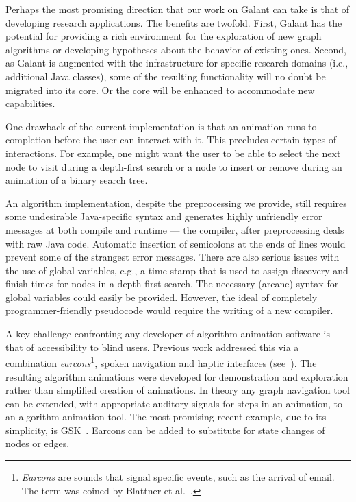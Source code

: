 Perhaps the most promising direction that our work on Galant can take is
that of developing research applications.
The benefits are twofold.
First, Galant has the potential for providing a rich environment for
the exploration of new graph algorithms or developing hypotheses about the
behavior of existing ones.
Second, as Galant is augmented with the infrastructure for specific research
domains (i.e., additional Java classes), some of the resulting functionality
will no doubt be migrated into its core. Or the core will be enhanced to
accommodate new capabilities.

One drawback of the current implementation is
that an animation runs to
completion before the user can interact with it.
This precludes certain types of interactions.
For example, one might want the user to be able to select the next node to
visit during a depth-first search or a node to insert or remove during an animation of
a binary search tree.

An algorithm implementation, despite the preprocessing we provide, still
requires some undesirable Java-specific syntax and generates highly
unfriendly error messages at both compile and runtime --- the compiler, after
preprocessing deals with raw Java code. Automatic insertion of semicolons at
the ends of lines would prevent some of the strangest error messages. There
are also serious issues with the use of global variables, e.g., a time stamp
that is used to assign discovery and finish times for nodes in a depth-first
search. The necessary (arcane) syntax for global variables could easily be
provided.
However, the ideal of completely programmer-friendly pseudocode would require
the writing of a new compiler.

A key challenge confronting any developer of algorithm animation
software is that of accessibility to blind users.
Previous work addressed this via a combination \emph{earcons}\footnote{
\emph{Earcons} are sounds that signal specific events, such as the arrival of email. The term was coined by Blattner et al.~\cite{1989-HCI-Blattner-earcons}.
}, spoken navigation
and haptic interfaces
(see~\cite{2002-SoftViz-Baloian,2005-SCCC-Baloian,2002-Diagrams-Bennett}).
The resulting algorithm animations were developed for demonstration and exploration rather than simplified
creation of
animations.
In theory any graph navigation tool can be extended, with appropriate auditory
signals for steps in an animation, to an algorithm animation tool.
The most promising recent example, due to its simplicity, is GSK~\cite{2013-SIGCSE-Balik}.
Earcons can be added to substitute for state changes of nodes or edges.

